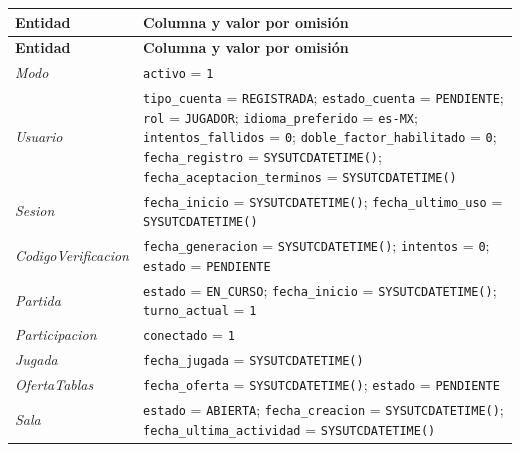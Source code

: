 \begin{center}\small
\begin{longtable}{|L{0.22\textwidth}|L{0.68\textwidth}|}
\hline
\textbf{Entidad} & \textbf{Columna y valor por omisión} \\ \hline
\endfirsthead
\hline
\textbf{Entidad} & \textbf{Columna y valor por omisión} \\ \hline
\endhead
\textit{Modo} & \texttt{activo} = \texttt{1} \\ \hline
\textit{Usuario} & \texttt{tipo\_\allowbreak{}cuenta} = \texttt{\textquotesingle{}REGISTRADA\textquotesingle{}}; \texttt{estado\_\allowbreak{}cuenta} = \texttt{\textquotesingle{}PENDIENTE\textquotesingle{}}; \texttt{rol} = \texttt{\textquotesingle{}JUGADOR\textquotesingle{}}; \texttt{idioma\_\allowbreak{}preferido} = \texttt{\textquotesingle{}es-MX\textquotesingle{}}; \texttt{intentos\_\allowbreak{}fallidos} = \texttt{0}; \texttt{doble\_\allowbreak{}factor\_\allowbreak{}habilitado} = \texttt{0}; \texttt{fecha\_\allowbreak{}registro} = \texttt{SYSUTCDATETIME()}; \texttt{fecha\_\allowbreak{}aceptacion\_\allowbreak{}terminos} = \texttt{SYSUTCDATETIME()} \\ \hline
\textit{Sesion} & \texttt{fecha\_\allowbreak{}inicio} = \texttt{SYSUTCDATETIME()}; \texttt{fecha\_\allowbreak{}ultimo\_\allowbreak{}uso} = \texttt{SYSUTCDATETIME()} \\ \hline
\textit{Codigo\-Verificacion} & \texttt{fecha\_\allowbreak{}generacion} = \texttt{SYSUTCDATETIME()}; \texttt{intentos} = \texttt{0}; \texttt{estado} = \texttt{\textquotesingle{}PENDIENTE\textquotesingle{}} \\ \hline
\textit{Partida} & \texttt{estado} = \texttt{\textquotesingle{}EN\_\allowbreak{}CURSO\textquotesingle{}}; \texttt{fecha\_\allowbreak{}inicio} = \texttt{SYSUTCDATETIME()}; \texttt{turno\_\allowbreak{}actual} = \texttt{1} \\ \hline
\textit{Participacion} & \texttt{conectado} = \texttt{1} \\ \hline
\textit{Jugada} & \texttt{fecha\_\allowbreak{}jugada} = \texttt{SYSUTCDATETIME()} \\ \hline
\textit{Oferta\-Tablas} & \texttt{fecha\_\allowbreak{}oferta} = \texttt{SYSUTCDATETIME()}; \texttt{estado} = \texttt{\textquotesingle{}PENDIENTE\textquotesingle{}} \\ \hline
\textit{Sala} & \texttt{estado} = \texttt{\textquotesingle{}ABIERTA\textquotesingle{}}; \texttt{fecha\_\allowbreak{}creacion} = \texttt{SYSUTCDATETIME()}; \texttt{fecha\_\allowbreak{}ultima\_\allowbreak{}actividad} = \texttt{SYSUTCDATETIME()} \\ \hline

\end{longtable}
\end{center}
